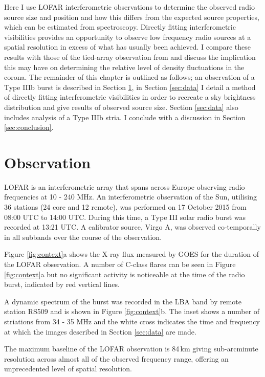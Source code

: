 Here I use LOFAR interferometric observations to determine the observed radio source size and position and how this differs from the expected source properties, which can be estimated from spectroscopy. %
Directly fitting interferometric visibilities provides an opportunity to observe low frequency radio sources at a spatial resolution in excess of what has usually been achieved. I compare these results with those of the tied-array observation from \cite{Kontar2017} and discuss the implication this may have on determining the relative level of density fluctuations in the corona. 
The remainder of this chapter is outlined as follows; an observation of a Type IIIb burst is described in Section \ref{sec:obs}, in Section \ref{sec:data} I detail a method of directly fitting interferometric visibilities in order to recreate a sky brightness distribution and give results of observed source size. Section \ref{sec:data} also includes analysis of a Type IIIb stria. I conclude with a discussion in Section \ref{sec:conclusion}.

\section{Observation} \label{sec:obs}
LOFAR is an interferometric array that spans across Europe observing radio frequencies at 10 - 240 MHz. 
An interferometric observation of the Sun, utilising 36 stations (24 core and 12 remote), was performed on 17 October 2015 from 08:00 UTC to 14:00 UTC. During this time, a Type III solar radio burst was recorded  at 13:21 UTC. A calibrator source, Virgo A, was observed co-temporally in all subbands over the course of the observation.

Figure \ref{fig:context}a shows the X-ray flux measured by GOES for the duration of the LOFAR observation. A number of C-class flares can be seen in Figure \ref{fig:context}a but no significant activity is noticeable at the time of the radio burst, indicated by red vertical lines.

A dynamic spectrum of the burst was recorded in the LBA band by remote station RS509 and is shown in Figure \ref{fig:context}b. The inset shows a number of striations from 34 - 35 MHz and the white cross indicates the time and frequency at which the images described in Section \ref{sec:data} are made.

The maximum baseline of the LOFAR observation is 84\,km giving sub-arcminute resolution across almost all of the observed frequency range, offering an unprecedented level of spatial resolution.

